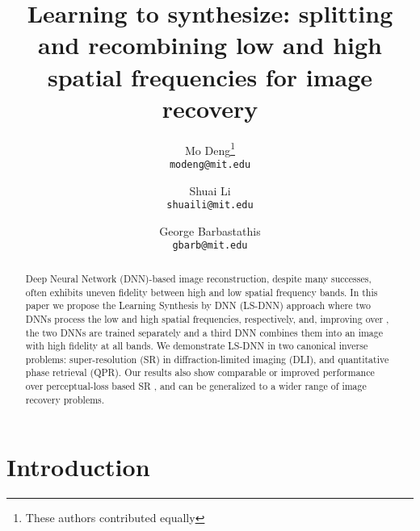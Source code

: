 \documentclass[10pt,twocolumn,letterpaper]{article}
\begin{document}
\title{Learning to synthesize: splitting and recombining low and high spatial frequencies for image recovery}

\author{Mo Deng\thanks{These authors contributed equally}\\
{\tt\small modeng@mit.edu}
\and
Shuai Li\footnotemark[1]\\
{\tt\small shuaili@mit.edu}
\and
George Barbastathis\\
{\tt\small gbarb@mit.edu}
}

\maketitle

\begin{abstract}
Deep Neural Network (DNN)-based image reconstruction, despite many successes, often exhibits uneven fidelity between high and low spatial frequency bands. In this paper we propose the Learning Synthesis by DNN (LS-DNN) approach where two DNNs process the low and high spatial frequencies, respectively, and, improving over \cite{Pan_2018_CVPR}, the two DNNs are trained separately and a third DNN combines them into an image with high fidelity at all bands. We demonstrate LS-DNN in two canonical inverse problems: super-resolution (SR) in diffraction-limited imaging (DLI), and quantitative phase retrieval (QPR). Our results also show comparable or improved performance over perceptual-loss based SR \cite{johnson2016perceptual}, and can be generalized to a wider range of image recovery problems. 
\end{abstract}

\section{Introduction}
\end{document}
